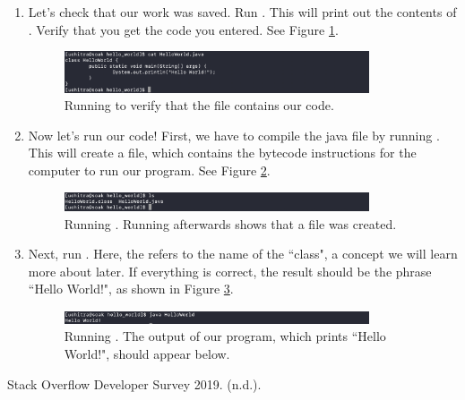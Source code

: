 \begin{enumerate}
\item Let's check that our work was saved. Run . This will print out the contents of . Verify that you get the code you entered. See Figure \ref{fig:linux:exercise:seven}.

\begin{figure}[ht]
	\centering
	\includegraphics[width=0.85\textwidth]{images/commandLineExercise_seven}
	\caption{Running  to verify that the  file contains our code.}
	\label{fig:linux:exercise:seven}
\end{figure}

\item Now let's run our code! First, we have to compile the java file by running . This will create a  file, which contains the bytecode instructions for the computer to run our program. See Figure \ref{fig:linux:exercise:eight}.

\begin{figure}[ht]
	\centering
	\includegraphics[width=0.85\textwidth]{images/commandLineExercise_eight}
	\caption{Running . Running  afterwards shows that a  file was created.}
	\label{fig:linux:exercise:eight}
\end{figure}

\item Next, run . Here, the  refers to the name of the ``class", a concept we will learn more about later. If everything is correct, the result should be the phrase ``Hello World!", as shown in Figure \ref{fig:linux:exercise:nine}.

\begin{figure}[ht]
	\centering
	\includegraphics[width=0.85\textwidth]{images/commandLineExercise_nine}
	\caption{Running . The output of our program, which prints ``Hello World!", should appear below.}
	\label{fig:linux:exercise:nine}
\end{figure}

\end{enumerate}




Stack Overflow Developer Survey 2019. (n.d.).